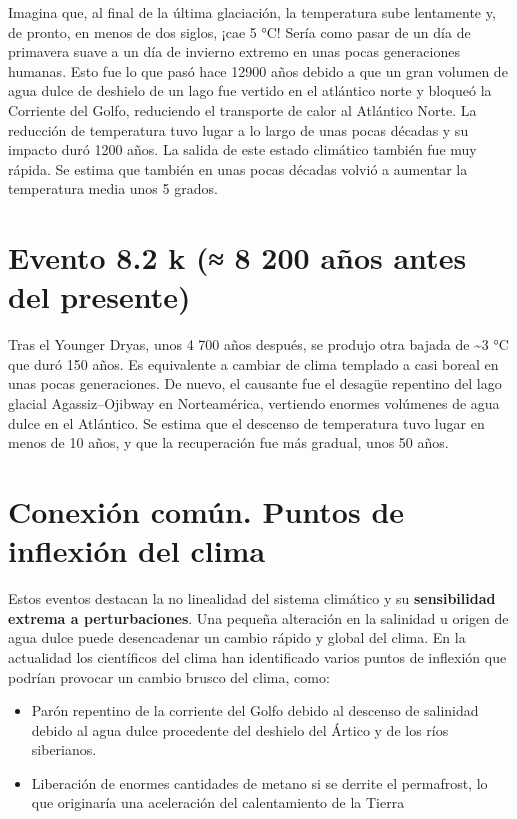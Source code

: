 \documentclass[
  10pt,
  a4paper,
  DIV=11,
  numbers=noendperiod,
  open=any]{scrreprt}
\providecommand{\tightlist}{%
  \setlength{\itemsep}{0pt}\setlength{\parskip}{0pt}}
\numberwithin{equation}{chapter}
\numberwithin{equation}{section}
\renewcommand{\[}{\begin{equation}}
\renewcommand{\]}{\end{equation}}
\begin{document}
Imagina que, al final de la última glaciación, la temperatura sube
lentamente y, de pronto, en menos de dos siglos, ¡cae 5 °C! Sería como
pasar de un día de primavera suave a un día de invierno extremo en unas
pocas generaciones humanas. Esto fue lo que
pasó hace 12900 años debido a que un gran volumen de agua dulce de
deshielo de un lago fue vertido en el atlántico norte y bloqueó la
Corriente del Golfo, reduciendo el transporte de calor al Atlántico
Norte. La reducción de temperatura tuvo lugar a lo largo de unas pocas
décadas y su impacto duró 1200 años. La salida de este estado climático
también fue muy rápida. Se estima que también en unas pocas décadas
volvió a aumentar la temperatura media unos 5 grados.

\section{Evento 8.2 k (≈ 8 200 años antes del
presente)}\label{evento-8.2-k-8-200-auxf1os-antes-del-presente}

Tras el Younger Dryas, unos 4 700 años después, se produjo otra bajada
de \textasciitilde3 °C que duró 150 años. Es equivalente a cambiar de
clima templado a casi boreal en unas pocas generaciones. De nuevo, el causante fue el desagüe repentino del lago
glacial Agassiz--Ojibway en Norteamérica, vertiendo enormes volúmenes de
agua dulce en el Atlántico. Se estima que el descenso de temperatura
tuvo lugar en menos de 10 años, y que la recuperación fue más gradual,
unos 50 años.

\section{Conexión común. Puntos de inflexión del
clima}\label{conexiuxf3n-comuxfan.-puntos-de-inflexiuxf3n-del-clima}

Estos eventos destacan la no linealidad del sistema climático y su
\textbf{sensibilidad extrema a perturbaciones}. Una pequeña alteración
en la salinidad u origen de agua dulce puede desencadenar un cambio
rápido y global del clima. En la actualidad los científicos del clima
han identificado varios puntos de inflexión que podrían provocar un
cambio brusco del clima, como:

\begin{itemize}
\tightlist
\item
  Parón repentino de la corriente del Golfo debido al descenso de
  salinidad debido al agua dulce procedente del deshielo del Ártico y de
  los ríos siberianos.
\item
  Liberación de enormes cantidades de metano si se derrite el
  permafrost, lo que originaría una aceleración del calentamiento de la
  Tierra
\end{itemize}
\end{document}
